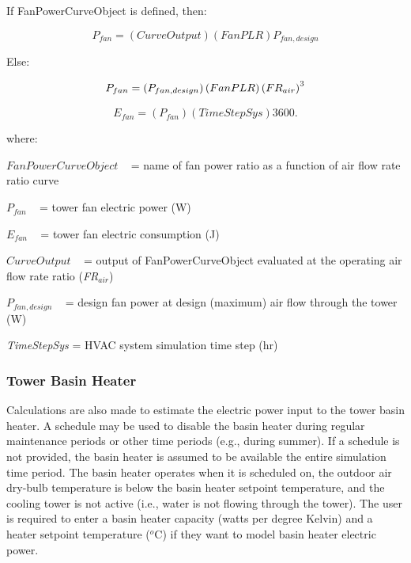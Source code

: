 If FanPowerCurveObject is defined, then:

\begin{equation}
  P_{fan} = \left( {CurveOutput} \right)\left( {FanPLR} \right){P_{fan,design}}
\end{equation}

Else:

\begin{equation}
  P_{fan} = \left( {{P_{fan,design}}} \right)\left( {FanPLR} \right){\left( {F{R_{air}}} \right)^{\rm{3}}}
\end{equation}

\begin{equation}
{E_{fan}} = \left( {{P_{fan}}} \right)\left( {TimeStepSys} \right)3600.
\end{equation}

where:

\(FanPowerCurveObject\) ~ = name of fan power ratio as a function of air flow rate ratio curve

\({P_{fan}}\) ~ = tower fan electric power (W)

\({E_{fan}}\) ~ = tower fan electric consumption (J)

\(CurveOutput\) ~ = output of FanPowerCurveObject evaluated at the operating air flow rate ratio (\emph{FR\(_{air}\)})

\({P_{fan,design}}\) ~ = design fan power at design (maximum) air flow through the tower (W)

\emph{TimeStepSys} = HVAC system simulation time step (hr)

\subsubsection{Tower Basin Heater}\label{tower-basin-heater-1}

Calculations are also made to estimate the electric power input to the tower basin heater. A schedule may be used to disable the basin heater during regular maintenance periods or other time periods (e.g., during summer). If a schedule is not provided, the basin heater is assumed to be available the entire simulation time period. The basin heater operates when it is scheduled on, the outdoor air dry-bulb temperature is below the basin heater setpoint temperature, and the cooling tower is not active (i.e., water is not flowing through the tower). The user is required to enter a basin heater capacity (watts per degree Kelvin) and a heater setpoint temperature (\(^{o}\)C) if they want to model basin heater electric power.

